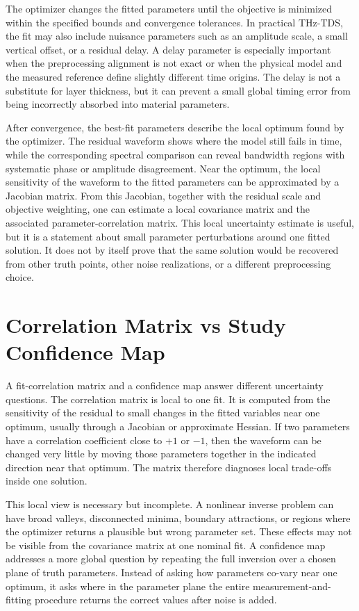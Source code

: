 \documentclass[11pt]{article}
\begin{document}
The optimizer changes the fitted parameters until the objective is minimized within the specified bounds and convergence tolerances. In practical THz-TDS, the fit may also include nuisance parameters such as an amplitude scale, a small vertical offset, or a residual delay. A delay parameter is especially important when the preprocessing alignment is not exact or when the physical model and the measured reference define slightly different time origins. The delay is not a substitute for layer thickness, but it can prevent a small global timing error from being incorrectly absorbed into material parameters.

After convergence, the best-fit parameters describe the local optimum found by the optimizer. The residual waveform shows where the model still fails in time, while the corresponding spectral comparison can reveal bandwidth regions with systematic phase or amplitude disagreement. Near the optimum, the local sensitivity of the waveform to the fitted parameters can be approximated by a Jacobian matrix. From this Jacobian, together with the residual scale and objective weighting, one can estimate a local covariance matrix and the associated parameter-correlation matrix. This local uncertainty estimate is useful, but it is a statement about small parameter perturbations around one fitted solution. It does not by itself prove that the same solution would be recovered from other truth points, other noise realizations, or a different preprocessing choice.

\section{Correlation Matrix vs Study Confidence Map}

A fit-correlation matrix and a confidence map answer different uncertainty questions. The correlation matrix is local to one fit. It is computed from the sensitivity of the residual to small changes in the fitted variables near one optimum, usually through a Jacobian or approximate Hessian. If two parameters have a correlation coefficient close to \(+1\) or \(-1\), then the waveform can be changed very little by moving those parameters together in the indicated direction near that optimum. The matrix therefore diagnoses local trade-offs inside one solution.

This local view is necessary but incomplete. A nonlinear inverse problem can have broad valleys, disconnected minima, boundary attractions, or regions where the optimizer returns a plausible but wrong parameter set. These effects may not be visible from the covariance matrix at one nominal fit. A confidence map addresses a more global question by repeating the full inversion over a chosen plane of truth parameters. Instead of asking how parameters co-vary near one optimum, it asks where in the parameter plane the entire measurement-and-fitting procedure returns the correct values after noise is added.
\end{document}
